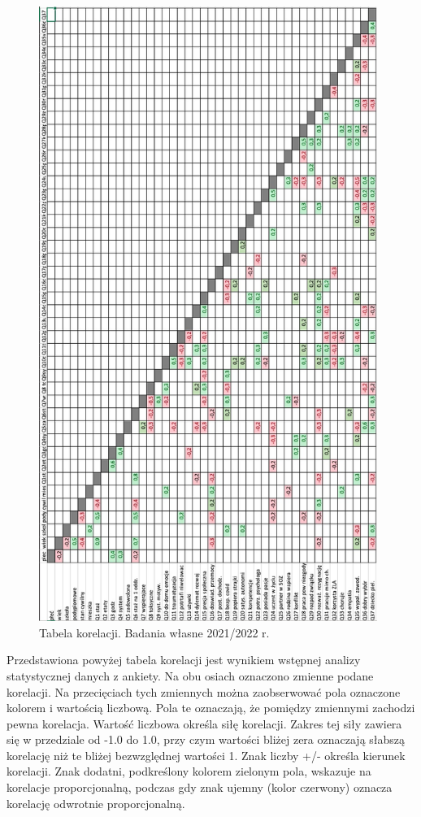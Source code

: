 \documentclass[a4paper,12pt,twoside,openright]{mwrep}
\begin{document}
\begin{appendices}
\begin{figure}[H]
\centering
\includegraphics[width=11cm]{wyniki/crosstable90}
\caption{Tabela korelacji. Badania własne 2021/2022 r.}
\label{rys:crosstable}
\end{figure}

Przedstawiona powyżej tabela korelacji jest wynikiem wstępnej analizy statystycznej danych z ankiety. Na obu osiach oznaczono zmienne podane korelacji. Na przecięciach tych zmiennych można zaobserwować pola oznaczone kolorem i wartością liczbową. Pola te oznaczają, że pomiędzy zmiennymi zachodzi pewna korelacja. 
Wartość liczbowa określa siłę korelacji. Zakres tej siły zawiera się w przedziale od -1.0 do 1.0, przy czym wartości bliżej zera oznaczają słabszą korelację niż te bliżej bezwzględnej wartości 1. Znak liczby +/- określa kierunek korelacji. Znak dodatni, podkreślony kolorem zielonym pola, wskazuje na korelacje proporcjonalną, podczas gdy znak ujemny (kolor czerwony) oznacza korelację odwrotnie proporcjonalną.

\end{appendices}


\end{document}
